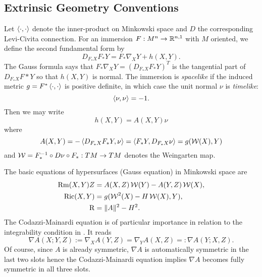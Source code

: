 \documentclass[a4paper, 12pt]{amsart}
\begin{document}
\subsection{Extrinsic Geometry Conventions}
\label{subsec:notation_extrinsic}

Let \(\left\langle \cdot,\cdot \right\rangle\) denote the inner-product on Minkowski space and \(D\) the corresponding Levi-Civita connection. For an immersion \(F : M^n \to \mathbb{R}^{n,1}\) with \(M\) oriented, we define the second fundamental form by
\[
D_{F_{\ast} X} F_{\ast} Y = F_{\ast} \nabla_X Y + h(X, Y).
\]
The Gauss formula says that \(F_{\ast} \nabla_X Y = (D_{F_{\ast} X} F_{\ast} Y)^T\) is the tangential part of \(D_{F_{\ast} X} F{\ast} Y\) so that \(h(X, Y)\) is normal. The immersion is \emph{spacelike} if the induced metric \(g = F^{\ast} \left\langle \cdot,\cdot \right\rangle\) is positive definite, in which case the unit normal \(\nu\) is \emph{timelike}:
\[
\left\langle \nu,\nu \right\rangle = -1.
\]
Then we may write
\[
h(X, Y) = A(X, Y) \nu
\]
where
\[
A(X, Y) = -\left\langle D_{F_{\ast} X} F_{\ast} Y,\nu \right\rangle = \left\langle F_{\ast} Y,D_{F_{\ast} X} \nu \right\rangle = g(\operatorname{\mathcal{W}}(X), Y)
\]
and \(\operatorname{\mathcal{W}} = F_{\ast}^{-1} \circ D\nu \circ F_{\ast}: TM \to TM\) denotes the Weingarten map.

The basic equations of hypersurfaces (Gauss equation) in Minkowski space are
\begin{equation}
\label{eq:gauss}
\begin{split}
\operatorname{Rm}(X, Y) Z &= A(X, Z) \operatorname{\mathcal{W}}(Y) - A(Y, Z) \operatorname{\mathcal{W}}(X), \\
\operatorname{Ric}(X, Y) &= g(\operatorname{\mathcal{W}}^2(X) - H \operatorname{\mathcal{W}}(X), Y), \\
\operatorname{R} &= \|A\|^2 - H^2.
\end{split}
\end{equation}
The Codazzi-Mainardi equation is of particular importance in relation to the integrability condition in . It reads
\begin{equation}
\label{eq:codazzi}
\nabla A (X; Y, Z) := \nabla_X A (Y, Z) = \nabla_Y A(X, Z) =: \nabla A(Y; X, Z).
\end{equation}
Of course, since \(A\) is already symmetric, \(\nabla A\) is automatically symmetric in the last two slots hence the Codazzi-Mainardi equation implies \(\nabla A\) becomes fully symmetric in all three slots.
\end{document}
